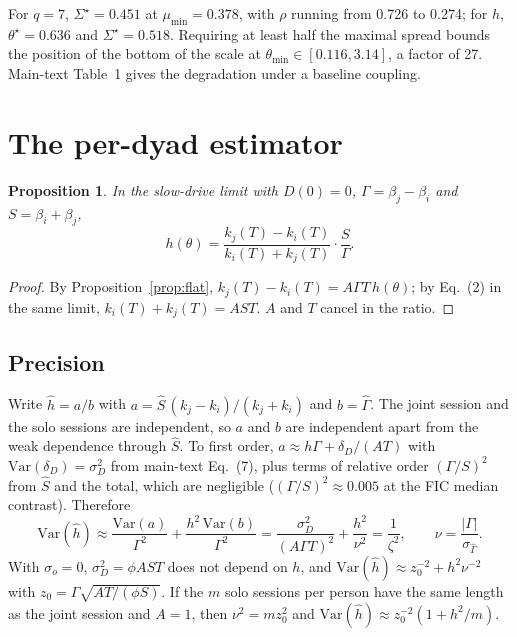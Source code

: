 \documentclass[12pt]{article}
\newtheorem{proposition}{Proposition}[section]
\theoremstyle{definition}
\newcommand{\ki}{k_i}
\newcommand{\kj}{k_j}
\begin{document}
For $q=7$, $\Sigma^\star=0.451$ at $\mu_{\min}=0.378$, with $\rho$ running from
0.726 to 0.274; for $h$, $\theta^\star=0.636$ and $\Sigma^\star=0.518$. Requiring at
least half the maximal spread bounds the position of the bottom of the scale at
$\theta_{\min}\in[0.116,3.14]$, a factor of 27. Main-text Table~1 gives the
degradation under a baseline coupling.

\section{The per-dyad estimator}\label{sec:perdyad}

\begin{proposition}\label{prop:estimator}
In the slow-drive limit with $D(0)=0$, $\Gamma=\beta_j-\beta_i$ and
$S=\beta_i+\beta_j$,
\begin{equation}\label{eq:estimator}
h(\theta)=\frac{\kj(T)-\ki(T)}{\ki(T)+\kj(T)}\cdot\frac{S}{\Gamma}.
\end{equation}
\end{proposition}
\begin{proof}
By Proposition~\ref{prop:flat}, $\kj(T)-\ki(T)=A\Gamma T\,h(\theta)$; by Eq.~(2)
in the same limit, $\ki(T)+\kj(T)=AST$. $A$ and $T$ cancel in the ratio.
\end{proof}

\subsection{Precision}

Write $\hat h=a/b$ with $a=\hat S\,(\kj-\ki)/(\kj+\ki)$ and $b=\hat\Gamma$. The
joint session and the solo sessions are independent, so $a$ and $b$ are
independent apart from the weak dependence through $\hat S$. To first order,
$a\approx h\Gamma+\delta_D/(AT)$ with $\mathrm{Var}(\delta_D)=\sigma_D^2$ from main-text
Eq.~(7), plus terms of relative order $(\Gamma/S)^2$ from $\hat S$ and the total,
which are negligible ($(\Gamma/S)^2\approx0.005$ at the FIC median contrast).
Therefore
\begin{equation}\label{eq:var}
\mathrm{Var}(\hat h)\approx\frac{\mathrm{Var}(a)}{\Gamma^2}+\frac{h^2\,\mathrm{Var}(b)}{\Gamma^2}
=\frac{\sigma_D^2}{(A\Gamma T)^2}+\frac{h^2}{\nu^2}=\frac{1}{\zeta^2},
\qquad \nu=\frac{|\Gamma|}{\sigma_{\hat\Gamma}} .
\end{equation}
With $\sigma_o=0$, $\sigma_D^2=\phi AST$ does not depend on $h$, and
$\mathrm{Var}(\hat h)\approx z_0^{-2}+h^2\nu^{-2}$ with $z_0=\Gamma\sqrt{AT/(\phi S)}$.
If the $m$ solo sessions per person have the same length as the joint session and
$A=1$, then $\nu^2=m z_0^2$ and $\mathrm{Var}(\hat h)\approx z_0^{-2}(1+h^2/m)$.
\end{document}
